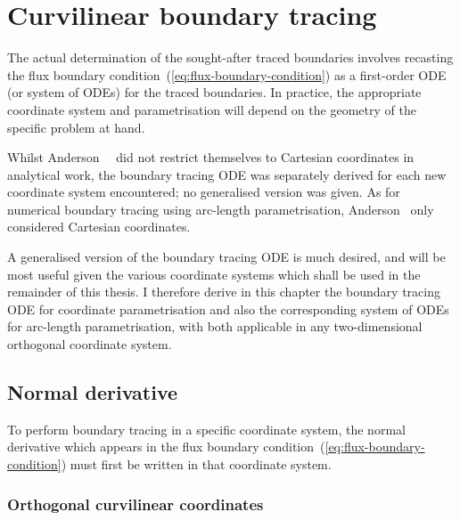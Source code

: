 \chapter{Curvilinear boundary tracing}
\label{ch:curvilinear}

The actual determination of the sought-after traced boundaries involves
recasting the flux boundary condition~(\ref{eq:flux-boundary-condition})
as a first-order ODE (or system of ODEs) for the traced boundaries.
In practice, the appropriate coordinate system and parametrisation
will depend on the geometry of the specific problem at hand.

Whilst Anderson~\etal~\cite{
  anderson-2007-boundary-tracing-i-theory,
  anderson-2007-boundary-tracing-ii-applications
}
did not restrict themselves to Cartesian coordinates in analytical work,
the boundary tracing ODE was separately derived
for each new coordinate system encountered;
no generalised version was given.
As for numerical boundary tracing using arc-length parametrisation,
Anderson~\cite{anderson-2002-thesis-boundary-tracing-pdes}
only considered Cartesian coordinates.

A generalised version of the boundary tracing ODE is much desired,
and will be most useful given the various coordinate systems
which shall be used in the remainder of this thesis.
I therefore derive in this chapter
the boundary tracing ODE for coordinate parametrisation
and also the corresponding system of ODEs for arc-length parametrisation,
with both applicable in any two-dimensional orthogonal coordinate system.

\section{Normal derivative}
\label{sec:curvilinear.derivative}

To perform boundary tracing in a specific coordinate system,
the normal derivative which appears
in the flux boundary condition~(\ref{eq:flux-boundary-condition})
must first be written in that coordinate system.

\subsection{Orthogonal curvilinear coordinates}
\label{sec:curvilinear.derivative.orthogonal}

\begin{figure}
\end{figure}

